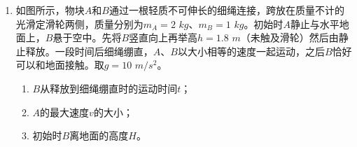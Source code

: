 \begin{enumerate}[leftmargin=0em]
\begin{enumerate}
\end{enumerate}
\begin{figure}[h!]
\flushright

\end{figure}





\item 
{}
如图所示，物块$ A $和$ B $通过一根轻质不可伸长的细绳连接，跨放在质量不计的光滑定滑轮两侧，质量分别为$ m_{A} =2 $ $ kg $、$ m_{B} =1 $ $ kg $。初始时$ A $静止与水平地面上，$ B $悬于空中。先将$ B $竖直向上再举高$ h=1.8 $ $ m $（未触及滑轮）然后由静止释放。一段时间后细绳绷直，$ A $、$ B $以大小相等的速度一起运动，之后$ B $恰好可以和地面接触。取$ g=10 $ $ m/s^{2} $。
\begin{enumerate}
\renewcommand{\labelenumi}{\arabic{enumi}.}
\item
$ B $从释放到细绳绷直时的运动时间$ t $；
\item 
$ A $的最大速度$ v $的大小；
\item 
初始时$ B $离地面的高度$ H $。

\end{enumerate}
\begin{figure}[h!]
\flushright

\end{figure}


\end{enumerate}
